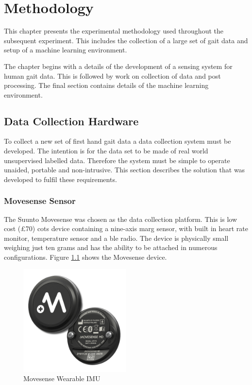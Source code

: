 \chapter{Methodology}
\label{chp:methods}
This chapter presents the experimental methodology used throughout the subsequent experiment. This includes the collection of a large set of gait data and setup of a machine learning environment.

The chapter begins with a details of the development of a sensing system for human gait data. This is followed by work on collection of data and post processing. The final section contains details of the machine learning environment.

\section{Data Collection Hardware}
To collect a new set of first hand gait data a data collection system must be developed. The intention is for the data set to be made of real world unsupervised labelled data. Therefore the system must be simple to operate unaided, portable and non-intrusive. This section describes the solution that was developed to fulfil these requirements.


\subsection{Movesense Sensor}
The Suunto Movesense was chosen as the data collection platform. This is low cost (£70) \acrfull{cots} device containing a nine-axis \acrshort{marg} sensor, with built in heart rate monitor, temperature sensor and a \acrfull{ble} radio. The device is physically small weighing just ten grams and has the ability to be attached in numerous configurations. Figure \ref{fig:methods-movesense-sensor} shows the Movesense device.

\begin{figure}[hbt]
    \centering
    \includegraphics[width=0.5\textwidth]{content/3-Methods/Movesense-MD-front-and-back.png}
    \caption[Movesense Wearable IMU]{Movesense Wearable IMU\cite{}} %
    \label{fig:methods-movesense-sensor}
\end{figure}

